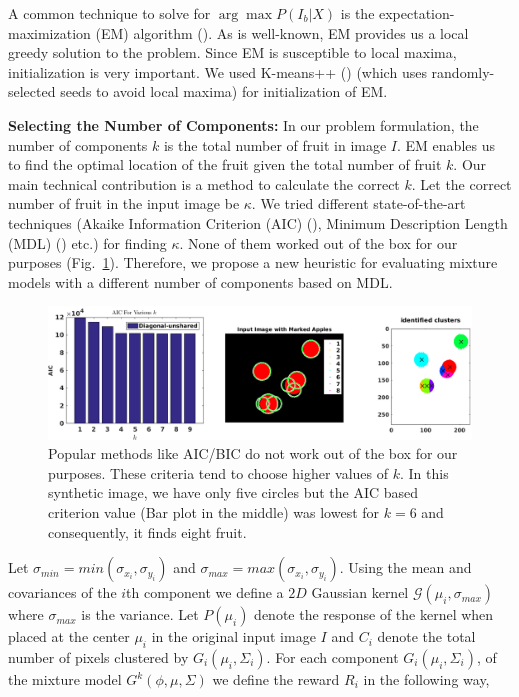 \noindent A common technique to solve for $\arg \max P(I_b|X)$ is the expectation-maximization (EM) algorithm (\cite{em}). As is well-known, EM provides us a local greedy solution to the problem. Since EM is susceptible to local maxima, initialization is very important. We used K-means++ (\cite{kmeans}) (which uses randomly-selected seeds to avoid local maxima) for initialization of EM. 

\textbf{Selecting the Number of Components:} In our problem formulation, the number of components $k$ is the total number of fruit in image $I$. EM enables us to find the optimal location of the fruit given the total number of fruit $k$. Our main technical contribution is a method to calculate the correct $k$. Let the correct number of fruit in the input image be $\kappa$. We tried different state-of-the-art techniques (Akaike Information Criterion (AIC) (\cite{mdt}), Minimum Description Length (MDL) (\cite{mdt}) etc.) for finding $\kappa$. None of them worked out of the box for our purposes (Fig.~\ref{fig:aic}). Therefore, we propose a new heuristic for evaluating mixture models with a different number of components based on MDL. 

\begin{figure}[!hbpt]

        \centering        
            \includegraphics[width=\textwidth]{figures/counting/AIC.png}           
        
   \caption[Failure of popular model section criteria.]{Popular methods like AIC/BIC do not work out of the box for our purposes. These criteria tend to choose higher values of $k$. In this synthetic image, we have only five circles but the AIC based criterion value (Bar plot in the middle) was lowest for $k = 6$ and consequently, it finds eight fruit.}
   \label{fig:aic}   
\end{figure}    



Let  $\sigma_{min} = min(\sigma_{x_{i}},\sigma_{y_{i}})$ and $\sigma_{max} = max(\sigma_{x_{i}},\sigma_{y_{i}})$. Using the mean and covariances of the $i$th component we define a $2D$ Gaussian kernel $\mathcal{G}(\mu_{i},\sigma_{max})$ where  $\sigma_{max}$ is the variance. Let $P(\mu_{i})$ denote the response of the kernel when placed at the center $\mu_{i}$ in the original input image $I$ and $C_{i}$ denote the total number of pixels clustered by $G_{i}(\mu_i,\Sigma_i)$. For each component $G_{i}(\mu_i,\Sigma_i)$, of the mixture model $G^k(\phi,\mu,\Sigma)$ we define the reward $R_{i}$ in the following way,


